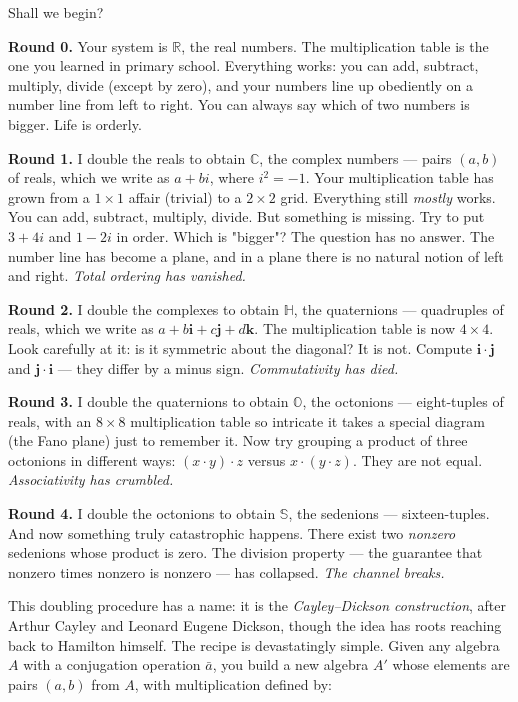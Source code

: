 \documentclass[11pt,twoside,openright]{book}
\theoremstyle{definition}
\theoremstyle{remark}
\begin{document}
Shall we begin?

\textbf{Round 0.} Your system is $\mathbb{R}$, the real numbers. The multiplication table is the one you learned in primary school. Everything works: you can add, subtract, multiply, divide (except by zero), and your numbers line up obediently on a number line from left to right. You can always say which of two numbers is bigger. Life is orderly.

\textbf{Round 1.} I double the reals to obtain $\mathbb{C}$, the complex numbers --- pairs $(a, b)$ of reals, which we write as $a + bi$, where $i^2 = -1$. Your multiplication table has grown from a $1 \times 1$ affair (trivial) to a $2 \times 2$ grid. Everything still \textit{mostly} works. You can add, subtract, multiply, divide. But something is missing. Try to put $3 + 4i$ and $1 - 2i$ in order. Which is "bigger"? The question has no answer. The number line has become a plane, and in a plane there is no natural notion of left and right. \textit{Total ordering has vanished.}

\textbf{Round 2.} I double the complexes to obtain $\mathbb{H}$, the quaternions --- quadruples of reals, which we write as $a + b\mathbf{i} + c\mathbf{j} + d\mathbf{k}$. The multiplication table is now $4 \times 4$. Look carefully at it: is it symmetric about the diagonal? It is not. Compute $\mathbf{i} \cdot \mathbf{j}$ and $\mathbf{j} \cdot \mathbf{i}$ --- they differ by a minus sign. \textit{Commutativity has died.}

\textbf{Round 3.} I double the quaternions to obtain $\mathbb{O}$, the octonions --- eight-tuples of reals, with an $8 \times 8$ multiplication table so intricate it takes a special diagram (the Fano plane) just to remember it. Now try grouping a product of three octonions in different ways: $(x \cdot y) \cdot z$ versus $x \cdot (y \cdot z)$. They are not equal. \textit{Associativity has crumbled.}

\textbf{Round 4.} I double the octonions to obtain $\mathbb{S}$, the sedenions --- sixteen-tuples. And now something truly catastrophic happens. There exist two \textit{nonzero} sedenions whose product is zero. The division property --- the guarantee that nonzero times nonzero is nonzero --- has collapsed. \textit{The channel breaks.}


This doubling procedure has a name: it is the \textit{Cayley--Dickson construction}, after Arthur Cayley and Leonard Eugene Dickson, though the idea has roots reaching back to Hamilton himself. The recipe is devastatingly simple. Given any algebra $A$ with a conjugation operation $\bar{a}$, you build a new algebra $A'$ whose elements are pairs $(a, b)$ from $A$, with multiplication defined by:
\end{document}
